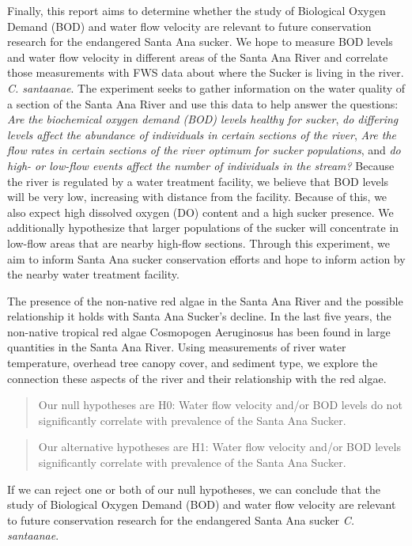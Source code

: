 \documentclass{article}\usepackage[]{graphicx}\usepackage[]{color}
\begin{document}
Finally, this report aims to determine whether the study of Biological Oxygen Demand (BOD) and water flow velocity are relevant to future conservation research for the endangered Santa Ana sucker. We hope to measure BOD levels and water flow velocity in different areas of the Santa Ana River and correlate those measurements with FWS data about where the Sucker is living in the river. \emph{C. santaanae}. The experiment seeks to gather information on the water quality of a section of the Santa Ana River and use this data to help answer the questions: \emph{Are the biochemical oxygen demand (BOD) levels healthy for sucker}, \emph{do differing levels affect the  abundance of individuals in certain sections of the river}, \emph{Are the flow rates in certain sections of the river optimum for sucker populations}, and \emph{do high- or low-flow events affect the number of individuals in the stream?} Because the river is regulated by a water treatment facility, we believe that BOD levels will be very low, increasing with distance from the facility. Because of this, we also expect high dissolved oxygen (DO) content and a high sucker presence. We additionally hypothesize that larger populations of the sucker will concentrate in low-flow areas that are nearby high-flow sections. Through this experiment, we aim to inform Santa Ana sucker conservation efforts and hope to inform action by the nearby water treatment facility. 

The presence of the non-native red algae in the Santa Ana River and the possible relationship it holds with Santa Ana Sucker's decline. In the last five years, the non-native tropical red algae Cosmopogen Aeruginosus has been found in large quantities in the Santa Ana River. Using measurements of river water temperature, overhead tree canopy cover, and sediment type, we explore the connection these aspects of the river and their relationship with the red algae.

\begin{quote}
Our null hypotheses are H0: Water flow velocity and/or BOD levels do not significantly correlate with prevalence of the Santa Ana Sucker.
\end{quote}
\begin{quote}
Our alternative hypotheses are H1: Water flow velocity and/or BOD levels significantly correlate with prevalence of the Santa Ana Sucker.
\end{quote}
If we can reject one or both of our null hypotheses, we can conclude that the study of Biological Oxygen Demand (BOD) and water flow velocity are relevant to future conservation research for the endangered Santa Ana sucker \emph{C. santaanae}.
\end{document}
